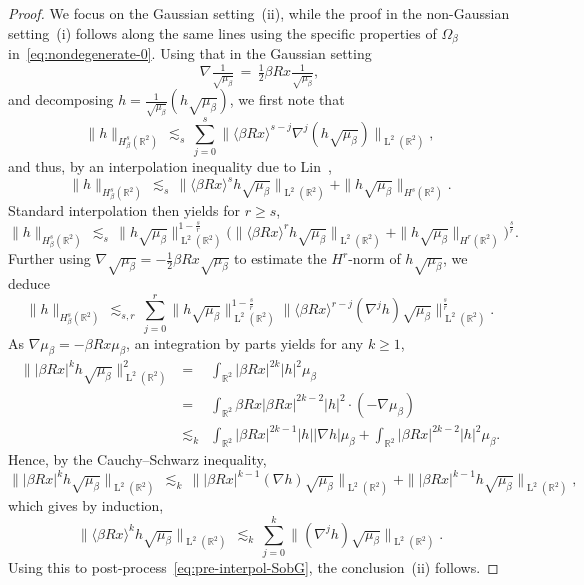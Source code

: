 \documentclass[a4paper,11pt,reqno,noindent]{amsart}
\theoremstyle{plain}
\numberwithin{equation}{section}
\newcommand{\R}{\mathbb R}
\newcommand{\3}{|\!|\!|}
\newcommand{\Ld}{\operatorname{L}}
\begin{document}
\begin{proof}
We focus on the Gaussian setting~(ii), while the proof in the non-Gaussian setting~(i) follows along the same lines using the specific properties of $\Omega_\beta$ in~\eqref{eq:nondegenerate-0}.
Using that in the Gaussian setting
\[\nabla\tfrac1{\sqrt{\mu_\beta}}\,=\,\tfrac12\beta Rx\tfrac1{\sqrt{\mu_\beta}},\]
and decomposing $h=\tfrac1{\sqrt{\mu_\beta}}(h\sqrt{\mu_\beta})$,
we first note that
\[\|h\|_{H^s_\beta(\R^2)}\,\lesssim_s\,\sum_{j=0}^s\|\langle\beta Rx\rangle^{s-j}\nabla^j(h\sqrt{\mu_\beta})\|_{\Ld^2(\R^2)},\]
and thus, by an interpolation inequality due to Lin~\cite{Lin-86},
\[\|h\|_{H^s_\beta(\R^2)}\,\lesssim_s\,\|\langle\beta Rx\rangle^{s}h\sqrt{\mu_\beta}\|_{\Ld^2(\R^2)}+\|h\sqrt{\mu_\beta}\|_{H^s(\R^2)}.\]
Standard interpolation then yields for $r\ge s$,
\[\|h\|_{H^s_\beta(\R^2)}\,\lesssim_s\,\|h\sqrt{\mu_\beta}\|_{\Ld^2(\R^2)}^{1-\frac sr}\Big(\|\langle\beta Rx\rangle^{r}h\sqrt{\mu_\beta}\|_{\Ld^2(\R^2)}+\|h\sqrt{\mu_\beta}\|_{H^r(\R^2)}\Big)^{\frac sr}.\]
Further using $\nabla\sqrt{\mu_\beta}=-\tfrac12\beta Rx\sqrt{\mu_\beta}$ to estimate the $H^r$-norm of $h\sqrt{\mu_\beta}$, we deduce
\begin{equation}\label{eq:pre-interpol-SobG}
\|h\|_{H^s_\beta(\R^2)}\,\lesssim_{s,r}\,\sum_{j=0}^r\|h\sqrt{\mu_\beta}\|_{\Ld^2(\R^2)}^{1-\frac sr}\|\langle\beta Rx\rangle^{r-j}(\nabla^jh)\sqrt{\mu_\beta}\|_{\Ld^2(\R^2)}^{\frac sr}.
\end{equation}
As $\nabla\mu_\beta=-\beta Rx\mu_\beta$, an integration by parts yields for any $k\ge1$,
\begin{eqnarray*}
\||\beta Rx|^kh\sqrt{\mu_\beta}\|_{\Ld^2(\R^2)}^2&=&\int_{\R^2}|\beta Rx|^{2k}|h|^2\mu_\beta\\
&=&\int_{\R^2}\beta Rx|\beta Rx|^{2k-2}|h|^2\cdot(- \nabla\mu_\beta)\\
&\lesssim_k&\int_{\R^2}|\beta Rx|^{2k-1}|h||\nabla h| \mu_\beta+\int_{\R^2}|\beta Rx|^{2k-2}|h|^2\mu_\beta.
\end{eqnarray*}
Hence, by the Cauchy--Schwarz inequality,
\begin{equation*}
\||\beta Rx|^kh\sqrt{\mu_\beta}\|_{\Ld^2(\R^2)}\,\lesssim_k\,\||\beta Rx|^{k-1}(\nabla h)\sqrt{\mu_\beta}\|_{\Ld^2(\R^2)}+\||\beta Rx|^{k-1}h\sqrt{\mu_\beta}\|_{\Ld^2(\R^2)},
\end{equation*}
which gives by induction,
\begin{equation*}
\|\langle\beta Rx\rangle^kh\sqrt{\mu_\beta}\|_{\Ld^2(\R^2)}\,\lesssim_k\,\sum_{j=0}^k\|(\nabla^jh)\sqrt{\mu_\beta}\|_{\Ld^2(\R^2)}.
\end{equation*}
Using this to post-process~\eqref{eq:pre-interpol-SobG}, the conclusion~(ii) follows.
\end{proof}
\end{document}

